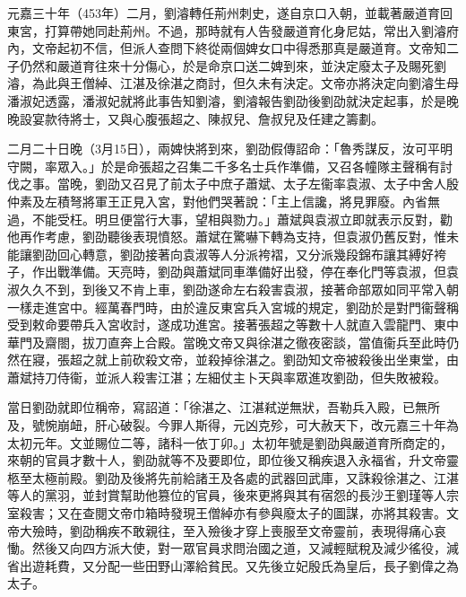 元嘉三十年（453年）二月，劉濬轉任荊州刺史，遂自京口入朝，並載著嚴道育回東宮，打算帶她同赴荊州。不過，那時就有人告發嚴道育化身尼姑，常出入劉濬府內，文帝起初不信，但派人查問下終從兩個婢女口中得悉那真是嚴道育。文帝知二子仍然和嚴道育往來十分傷心，於是命京口送二婢到來，並決定廢太子及賜死劉濬，為此與王僧綽、江湛及徐湛之商討，但久未有決定。文帝亦將決定向劉濬生母潘淑妃透露，潘淑妃就將此事告知劉濬，劉濬報告劉劭後劉劭就決定起事，於是晚晚設宴款待將士，又與心腹張超之、陳叔兒、詹叔兒及任建之籌劃。

二月二十日晚（3月15日），兩婢快將到來，劉劭假傳詔命：「魯秀謀反，汝可平明守闕，率眾入。」於是命張超之召集二千多名士兵作準備，又召各幢隊主聲稱有討伐之事。當晚，劉劭又召見了前太子中庶子蕭斌、太子左衞率袁淑、太子中舍人殷仲素及左積弩將軍王正見入宮，對他們哭著說：「主上信讒，將見罪廢。內省無過，不能受枉。明旦便當行大事，望相與勠力。」蕭斌與袁淑立即就表示反對，勸他再作考慮，劉劭聽後表現憤怒。蕭斌在驚嚇下轉為支持，但袁淑仍舊反對，惟未能讓劉劭回心轉意，劉劭接著向袁淑等人分派袴褶，又分派幾段錦布讓其縛好袴子，作出戰準備。天亮時，劉劭與蕭斌同車準備好出發，停在奉化門等袁淑，但袁淑久久不到，到後又不肯上車，劉劭遂命左右殺害袁淑，接著命部眾如同平常入朝一樣走進宮中。經萬春門時，由於違反東宮兵入宮城的規定，劉劭於是對門衞聲稱受到敕命要帶兵入宮收討，遂成功進宮。接著張超之等數十人就直入雲龍門、東中華門及齋閤，拔刀直奔上合殿。當晚文帝又與徐湛之徹夜密談，當值衞兵至此時仍然在寢，張超之就上前砍殺文帝，並殺掉徐湛之。劉劭知文帝被殺後出坐東堂，由蕭斌持刀侍衞，並派人殺害江湛；左細仗主卜天與率眾進攻劉劭，但失敗被殺。

當日劉劭就即位稱帝，寫詔道：「徐湛之、江湛弒逆無狀，吾勒兵入殿，已無所及，號惋崩衄，肝心破裂。今罪人斯得，元凶克殄，可大赦天下，改元嘉三十年為太初元年。文並賜位二等，諸科一依丁卯。」太初年號是劉劭與嚴道育所商定的，來朝的官員才數十人，劉劭就等不及要即位，即位後又稱疾退入永福省，升文帝靈柩至太極前殿。劉劭及後將先前給諸王及各處的武器回武庫，又誅殺徐湛之、江湛等人的黨羽，並封賞幫助他篡位的官員，後來更將與其有宿怨的長沙王劉瑾等人宗室殺害；又在查閱文帝巾箱時發現王僧綽亦有參與廢太子的圖謀，亦將其殺害。文帝大殮時，劉劭稱疾不敢親往，至入殮後才穿上喪服至文帝靈前，表現得痛心哀慟。然後又向四方派大使，對一眾官員求問治國之道，又減輕賦稅及減少徭役，減省出遊耗費，又分配一些田野山澤給貧民。又先後立妃殷氏為皇后，長子劉偉之為太子。

